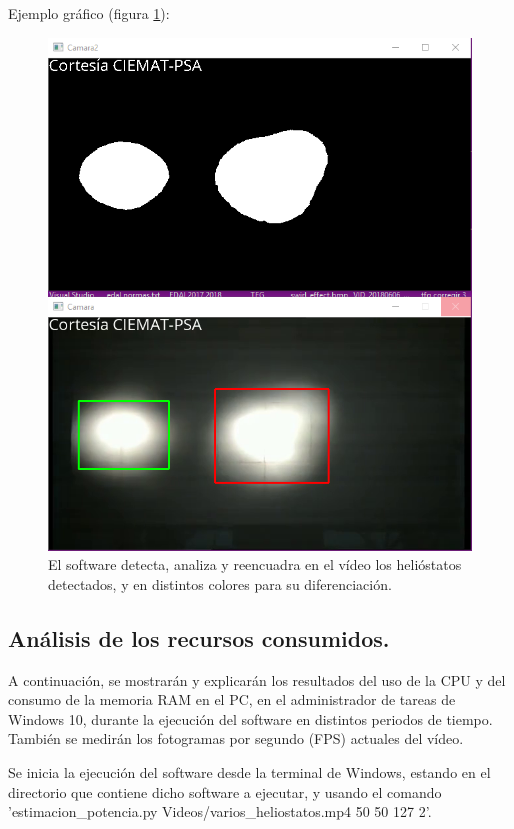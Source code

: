 Ejemplo gráfico (figura \ref{fig:CapturasEntradasYSalidas/unnamed(1).png}):

\begin{figure}[h!]
  	\centering
	\includegraphics[width=\textwidth]{CapturasEntradasYSalidas/unnamed(1).png}
	\caption{El software detecta, analiza y reencuadra en el vídeo los helióstatos detectados, y en distintos colores para su diferenciación.
	\label{fig:CapturasEntradasYSalidas/unnamed(1).png}}
\end{figure}

\subsection{Análisis de los recursos consumidos.}

A continuación, se mostrarán y explicarán los resultados del uso de la CPU y del consumo de la memoria RAM en el PC, en el administrador de tareas de Windows 10, durante la ejecución del software en distintos periodos de tiempo. También se medirán los fotogramas por segundo (FPS) actuales del vídeo.

Se inicia la ejecución del software desde la terminal de Windows, estando en el directorio que contiene dicho software a ejecutar, y usando el comando 'estimacion\_potencia.py Videos/varios\_heliostatos.mp4 50 50 127 2'.

